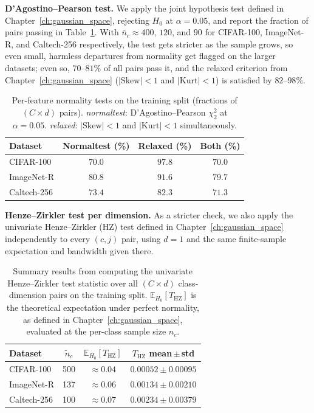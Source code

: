 \textbf{D'Agostino--Pearson test.}
We apply the joint hypothesis test defined in Chapter~\ref{ch:gaussian_space}, rejecting $H_0$ at $\alpha=0.05$, and report the fraction of pairs passing in Table~\ref{tab:gaussianity_normaltest}. With $\bar{n}_c \approx 400$, $120$, and $90$ for CIFAR-100, ImageNet-R, and Caltech-256 respectively, the test gets stricter as the sample grows, so even small, harmless departures from normality get flagged on the larger datasets; even so, $70$--$81\%$ of all pairs pass it, and the relaxed criterion from Chapter~\ref{ch:gaussian_space} ($|\mathrm{Skew}|<1$ and $|\mathrm{Kurt}|<1$) is satisfied by $82$--$98\%$.

\begin{table}[htb]
    \centering
    \caption{Per-feature normality tests on the training split (fractions of $(C \times d)$ pairs). \emph{normaltest}: D'Agostino--Pearson $\chi^2_2$ at $\alpha{=}0.05$. \emph{relaxed}: $|\mathrm{Skew}|<1$ and $|\mathrm{Kurt}|<1$ simultaneously.}
    \label{tab:gaussianity_normaltest}
    \small
    \setlength{\tabcolsep}{6pt}
    \begin{tabular}{lccc}
        \toprule
        \textbf{Dataset} & \textbf{Normaltest (\%)} & \textbf{Relaxed (\%)} & \textbf{Both (\%)} \\
        \midrule
        CIFAR-100   & $70.0$ & $97.8$ & $70.0$ \\
        ImageNet-R  & $80.8$ & $91.6$ & $79.7$ \\
        Caltech-256 & $73.4$ & $82.3$ & $71.3$ \\
        \bottomrule
    \end{tabular}
\end{table}

\textbf{Henze--Zirkler test per dimension.}
\label{sec:uv_hz_gaussianity_results}
As a stricter check, we also apply the univariate Henze--Zirkler (HZ) test defined in Chapter~\ref{ch:gaussian_space} independently to every $(c,j)$ pair, using $d=1$ and the same finite-sample expectation and bandwidth given there.

\begin{table}[htb]
	\centering
	\caption{Summary results from computing the univariate Henze--Zirkler test statistic over all $(C \times d)$ class-dimension pairs on the training split. $\mathbb{E}_{H_0}[T_{\mathrm{HZ}}]$ is the theoretical expectation under perfect normality, as defined in Chapter~\ref{ch:gaussian_space}, evaluated at the per-class sample size $n_c$.}
	\label{tab:gaussianity_hz_univariate}
	\small
	\setlength{\tabcolsep}{4pt}
	\begin{tabular}{lcc c}
		\toprule
		\textbf{Dataset} & $\tilde{n}_c$ & $\mathbb{E}_{H_0}[T_{\mathrm{HZ}}]$ & $T_{\mathrm{HZ}}$ mean\,$\pm$\,std \\
		\midrule
		CIFAR-100  & 500 & $\approx 0.04$ & $0.00052 \pm 0.00095$ \\
		ImageNet-R  & 137 & $\approx 0.06$ & $0.00134 \pm 0.00210$  \\
		Caltech-256 & 100 & $\approx 0.07$ & $0.00234 \pm 0.00379$  \\
		\bottomrule
	\end{tabular}
\end{table}

